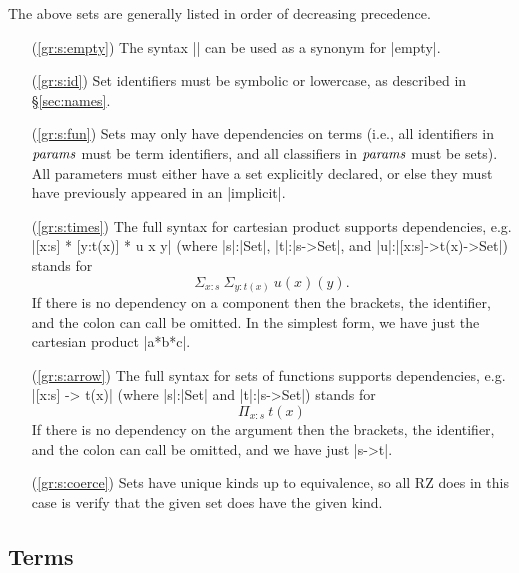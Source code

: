 \documentclass[11pt]{article}
\newcommand{\metav}[1]{\mbox{\textit{#1}}}
\newcommand{\Params}{\metav{params}}
\begin{document}
The above sets are generally listed in order of decreasing precedence.  
\begin{itemize}
\item[(\ref{gr:s:empty})] The syntax |{}| can be used as a synonym for |empty|.
\item[(\ref{gr:s:id})] Set identifiers must be symbolic or lowercase, as described in \S\ref{sec:names}.
\item[(\ref{gr:s:fun})] Sets may only have dependencies on terms (i.e., all identifiers in $\Params$ must be term identifiers, and all classifiers in $\Params$ must be sets).  All parameters must either have a set explicitly declared, or else they must have previously appeared in an |implicit|.
\item[(\ref{gr:s:times})] The full syntax for cartesian product supports dependencies, e.g. |[x:s] * [y:t(x)] * u x y| (where |s|:|Set|, |t|:|s->Set|, and |u|:|[x:s]->t(x)->Set|) stands
for 
\[
\Sigma_{x:s}\ \Sigma_{y:t(x)}\ u(x)(y).
\]
If there is no dependency on a component then the brackets, the identifier, and the colon can call be omitted.  In the simplest form, we have just the cartesian product |a*b*c|.
\item[(\ref{gr:s:arrow})] The full syntax for sets of functions supports dependencies, e.g. |[x:s] -> t(x)| (where |s|:|Set| and |t|:|s->Set|) stands
for 
\[
\Pi_{x:s}\ t(x)
\]
If there is no dependency on the argument then the brackets, the identifier, and the colon can call be omitted, and we have just |s->t|.
\item[(\ref{gr:s:coerce})] Sets have unique kinds up to equivalence, so all RZ does in this case is verify that the given set does have the given kind.
\end{itemize}

\subsection{Terms}
\end{document}
